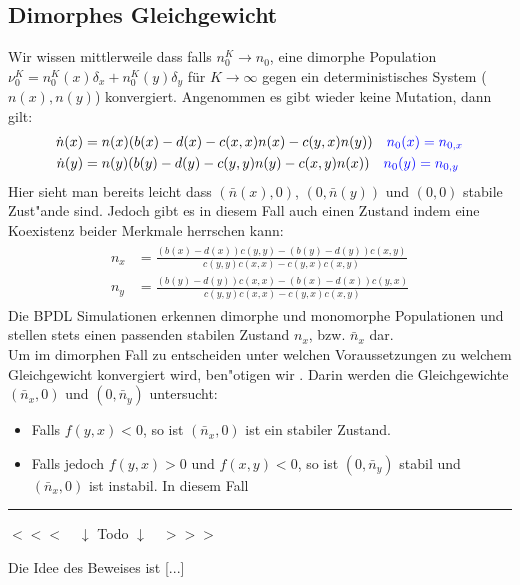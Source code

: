 \documentclass[11pt, a4paper, german]{article}
\theoremstyle{plain}
\begin{document}
	\subsection{Dimorphes Gleichgewicht}
		Wir wissen mittlerweile dass falls $ n_0^K \to n_0 $, eine dimorphe Population $ \nu_0^K = n_0^K(x) \delta_x + n_0^K(y) \delta_y $ für $ K \to \infty $ gegen ein deterministisches System ($ n(x), n(y) $) konvergiert. Angenommen es gibt wieder keine Mutation, dann gilt:\\
		\begin{align}
		\begin{split}
			\dot{n}(x) & = n(x) (b(x) - d(x) - c(x,x)n(x) - c(y,x) n(y)) \quad \textcolor{blue}{n_0(x) = n_{0,x}} \\
			\dot{n}(y) & = n(y) (b(y) - d(y) - c(y,y)n(y) - c(x,y) n(x)) \quad \textcolor{blue}{n_0(y) = n_{0,y}}
		\end{split}
		\end{align}
		Hier sieht man bereits leicht dass $ (\bar{n}(x), 0) $, $ (0, \bar{n}(y)) $ und $ (0,0) $ stabile Zust"ande sind. Jedoch gibt es in diesem Fall auch einen Zustand indem eine Koexistenz beider Merkmale herrschen kann:
		\begin{align}
		\begin{split}
			n_x &= \frac{(b(x) - d(x))c(y,y)-(b(y)-d(y))c(x,y)}{c(y,y)c(x,x) - c(y,x)c(x,y)}\\
			n_y &= \frac{(b(y) - d(y))c(x,x)-(b(x)-d(x))c(y,x)}{c(y,y)c(x,x) - c(y,x)c(x,y)}
		\end{split}
		\end{align}
		Die BPDL Simulationen erkennen dimorphe und monomorphe Populationen und stellen stets einen passenden stabilen Zustand $ n_x $, bzw. $ \bar{n}_x $ dar. \\
		Um im dimorphen Fall zu entscheiden unter welchen Voraussetzungen zu welchem Gleichgewicht konvergiert wird, ben"otigen wir \cite[Proposition 3]{Champagnat20061127}. Darin werden die Gleichgewichte $ (\bar{n}_x, 0) $ und $ (0, \bar{n}_y) $ untersucht:
		\begin{itemize}
			\item[] Falls $ f(y,x) < 0 $, so ist $ (\bar{n}_x, 0) $ ist ein stabiler Zustand.
			\item[] Falls jedoch $ f(y,x) > 0 $ und $ f(x,y) < 0 $, so ist $ (0, \bar{n}_y) $ stabil und $ (\bar{n}_x, 0) $ ist instabil. In diesem Fall
		\end{itemize}
\noindent\rule{\textwidth}{2pt}
\begin{center}
	$ <<< \quad \downarrow $ Todo $ \downarrow \quad >>> $
\end{center}
		Die Idee des Beweises ist [...]\\
		
\end{document}
